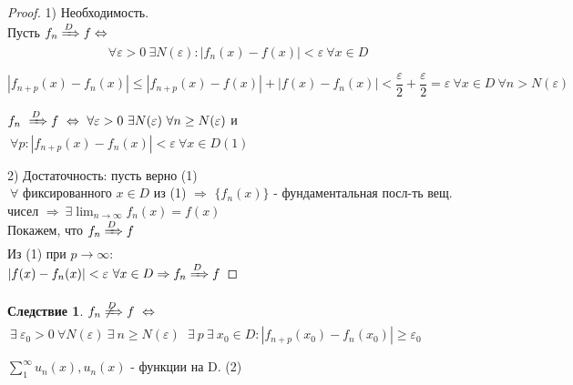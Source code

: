 \documentclass[a4paper, 12pt]{article}
\newtheorem{Consequence}{Следствие}
\begin{document}
    \begin{proof}
        1) Необходимость.\\
        Пусть $f_n \xRightarrow{D} f \Leftrightarrow$
        \[\ \forall \varepsilon > 0 \ \exists N(\varepsilon):
        \left| f_n(x) - f(x)\right| < \varepsilon \ \forall x \in D\]

        \[\left| f_{n + p}(x) - f_n(x)\right| \le
        \left| f_{n + p}(x) - f(x)\right| + \left| f(x) - f_n(x)\right|
        < \dfrac{\varepsilon}{2} + \dfrac{\varepsilon}{2} = \varepsilon
        \ \forall x \in D \ \forall n > N(\varepsilon)\]

        $f_n \ \xRightarrow{D} f \ \Leftrightarrow \ \forall \varepsilon > 0
        \ \exists N(\varepsilon) \ \forall n \ge N(\varepsilon)$ и $\ \forall
        p: \left| f_{n + p}(x) - f_n(x) \right| < \varepsilon \ \forall x
        \in D (1)$

        2) Достаточность: пусть верно (1) \\
        $\ \forall$ фиксированного $x \in D$ из (1) $\Rightarrow$ $\{f_n(x)\}$
        - фундаментальная посл-ть вещ. чисел $\Rightarrow \ \exists
        \displaystyle \lim^{}_{n \rightarrow \infty} f_n(x) = f(x)$ \\
        Покажем, что $f_n \xRightarrow{D} f$ \\
        Из (1) при $p \rightarrow \infty:$ \\
        $\left| f(x) - f_n(x) \right| < \varepsilon \ \forall x \in D
        \Rightarrow f_n \xRightarrow{D} f$
    \end{proof}
    \begin{Consequence}
        $f_n \not \xRightarrow{D} f \ \Leftrightarrow$\\
        $\ \exists \ \varepsilon_0
        > 0 \ \forall N(\varepsilon) \ \exists \  n \ge N(\varepsilon)$
        $\ \exists \  p \ \exists \  x_0 \in D:
        \left| f_{n + p}(x_0) - f_n(x_0)\right| \ge \varepsilon_0$
    \end{Consequence}

    \vspace{1cm}
    $\displaystyle \sum ^{\infty}_{1} u_n(x), u_n(x)$ - функции на D. (2)
\end{document}
